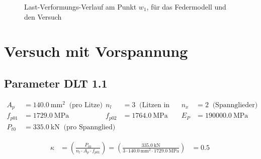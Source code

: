 \documentclass[
  10pt,
  letterpaper,
]{scrreprt}
\begin{document}
\begin{figure}[H]


\caption{\label{fig-l-w-sv14}Last-Verformungs-Verlauf am Punkt \(w_1\),
für das Federmodell und den Versuch}

\end{figure}%


\chapter{Versuch mit Vorspannung}\label{versuch-mit-vorspannung}

\section{Parameter DLT 1.1}\label{parameter-dlt-1.1}

$$
\begin{aligned}
A_{p} &= 140.0\ \mathrm{mm}^{2} \; \;\textrm{(pro Litze)}
 &n_{l} &= 3 \; \;\textrm{(Litzen in Spannglied)}
 &n_{x} &= 2 \; \;\textrm{(Spannglieder)}
\\[12pt]
 f_{p01} &= 1729.0\ \mathrm{MPa} \; 
 &f_{p02} &= 1764.0\ \mathrm{MPa} \; 
 &E_{P} &= 190000.0\ \mathrm{MPa} \; 
\\[12pt]
 P_{t0} &= 335.0\ \mathrm{kN} \; \;\textrm{(pro Spannglied)}
\end{aligned}
$$

$$
\begin{aligned}
\kappa &= \left( \frac{ P_{t0} }{ n_{l} \cdot A_{p} \cdot f_{p01} } \right)  = \left( \frac{ 335.0\ \mathrm{kN} }{ 3 \cdot 140.0\ \mathrm{mm}^{2} \cdot 1729.0\ \mathrm{MPa} } \right) &= 0.5\  
\end{aligned}
$$
\end{document}
